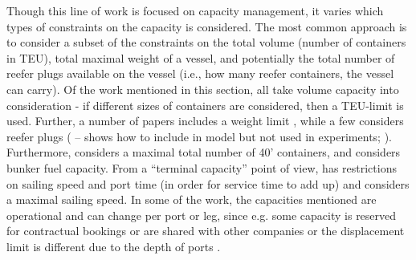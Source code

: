 Though this line of work is focused on capacity management, it varies which types of constraints on the capacity is considered. The most common approach is to consider a subset of the constraints on the total volume (number of containers in TEU), total maximal weight of a vessel, and potentially the total number of reefer plugs available on the vessel (i.e., how many reefer containers, the vessel can carry).  Of the work mentioned in this section, all take volume capacity into consideration - if different sizes of containers are considered, then a TEU-limit is used. Further, a number of papers includes a weight limit \citep{Bingzhou08, Zurheide15, Ting04, Xianzhi07, Feng08, Zurheide12, Wang15b, Lu10, Chang15, Wang19a, Feng07}, while a few considers reefer plugs (\citealp{Zurheide15, Ting04, Zurheide12,Wang15b} -- shows how to include in model but not used in experiments; \citealp{Lu10}). Furthermore, \citet{Ting04} considers a maximal total number of 40' containers, and \citet{Wang19a} considers bunker fuel capacity. From a ``terminal capacity'' point of view, \citet{Wang15b} has restrictions on sailing speed and port time (in order for service time to add up) and \citet{Wang19a} considers a maximal sailing speed. In some of the work, the capacities mentioned are operational and can change per port or leg, since e.g. some capacity is reserved for contractual bookings or are shared with other companies or the displacement limit is different due to the depth of ports \citep{Xianzhi07, Feng08, Zou08, Zurheide12, Chang15, Feng07}.


